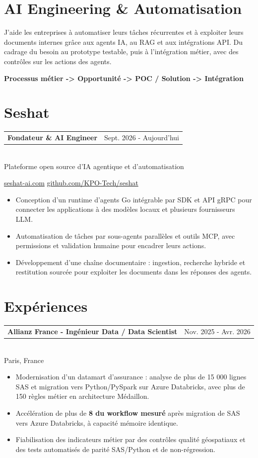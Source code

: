 \documentclass[10pt,a4paper]{article}
\makeatletter
\newcommand{\role}[3]{%
  \vspace{2.2pt}
  \begin{tabularx}{\linewidth}{@{}Xr@{}}
  \textbf{#1} & {\color{muted}#2}
  \end{tabularx}\vspace{0.8pt}\\
  {\color{muted}#3}\par
  \vspace{2pt}
}
\makeatother
\begin{document}
\begin{lrbox}{\maincolumnbox}
\begin{minipage}[t]{0.695\textwidth}
\vspace{0pt}
\raggedright

\section{AI Engineering \& Automatisation}
J'aide les entreprises à automatiser leurs tâches récurrentes et à exploiter leurs documents internes grâce aux agents IA, au RAG et aux intégrations API. Du cadrage du besoin au prototype testable, puis à l'intégration métier, avec des contrôles sur les actions des agents.

\textbf{\color{accent}Processus métier -> Opportunité -> POC / Solution -> Intégration}

\vspace{7pt}
\section{Seshat}
\role{Fondateur \& AI Engineer}{Sept. 2026 - Aujourd'hui}{Plateforme open source d'IA agentique et d'automatisation}
{\footnotesize \href{https://seshat-ai.com}{seshat-ai.com} \textbullet{} \href{https://github.com/KPO-Tech/seshat}{github.com/KPO-Tech/seshat}}\par
\begin{itemize}
  \item Conception d'un runtime d'agents Go intégrable par SDK et API gRPC pour connecter les applications à des modèles locaux et plusieurs fournisseurs LLM.
  \item Automatisation de tâches par sous-agents parallèles et outils MCP, avec permissions et validation humaine pour encadrer leurs actions.
  \item Développement d'une chaîne documentaire : ingestion, recherche hybride et restitution sourcée pour exploiter les documents dans les réponses des agents.
\end{itemize}

\section{Expériences}
\role{Allianz France - Ingénieur Data / Data Scientist}{Nov. 2025 - Avr. 2026}{Paris, France}
\begin{itemize}
  \item Modernisation d'un datamart d'assurance : analyse de plus de 15 000 lignes SAS et migration vers Python/PySpark sur Azure Databricks, avec plus de 150 règles métier en architecture Médaillon.
  \item Accélération de plus de \textbf{8\texttimes{} du workflow mesuré} après migration de SAS vers Azure Databricks, à capacité mémoire identique.
  \item Fiabilisation des indicateurs métier par des contrôles qualité géospatiaux et des tests automatisés de parité SAS/Python et de non-régression.
\end{itemize}


\end{minipage}
\end{lrbox}
\end{document}
